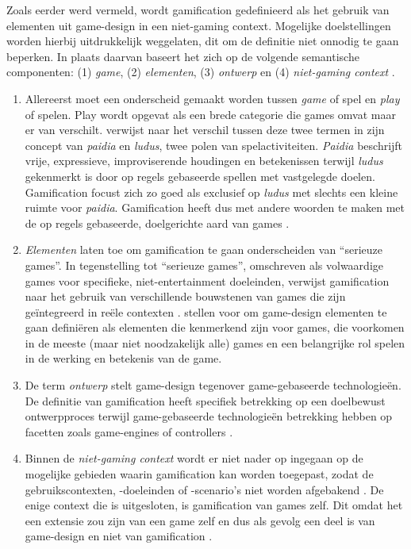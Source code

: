 Zoals eerder werd vermeld, wordt gamification gedefinieerd als het gebruik van elementen uit game-design in een niet-gaming context. Mogelijke doelstellingen worden hierbij uitdrukkelijk weggelaten, dit om de definitie niet onnodig te gaan beperken. In plaats daarvan baseert het zich op de volgende semantische componenten: (1) \textit{game}, (2) \textit{elementen}, (3) \textit{ontwerp} en (4) \textit{niet-gaming context} \autocite{Sailer2016}.

\begin{enumerate}[label=(\arabic*)]
    \item Allereerst moet een onderscheid gemaakt worden tussen \textit{game} of spel en \textit{play} of spelen. Play wordt opgevat als een brede categorie die games omvat maar er van verschilt. \textcite{Caillois2001} verwijst naar het verschil tussen deze twee termen in zijn concept van \textit{paidia} en \textit{ludus}, twee polen van spelactiviteiten. \textit{Paidia} beschrijft vrije, expressieve, improviserende houdingen en betekenissen terwijl \textit{ludus} gekenmerkt is door op regels gebaseerde spellen met vastgelegde doelen. Gamification focust zich zo goed als exclusief op \textit{ludus} met slechts een kleine ruimte voor \textit{paidia}. Gamification heeft dus met andere woorden te maken met de op regels gebaseerde, doelgerichte aard van games \autocite{Sailer2016}.
    \item \textit{Elementen} laten toe om gamification te gaan onderscheiden van ``serieuze games''. In tegenstelling tot ``serieuze games'', omschreven als volwaardige games voor specifieke, niet-entertainment doeleinden, verwijst gamification naar het gebruik van verschillende bouwstenen van games die zijn geïntegreerd in reële contexten \autocite{Groh2012}. \textcite{Deterding20112} stellen voor om game-design elementen te gaan definiëren als elementen die kenmerkend zijn voor games, die voorkomen in de meeste (maar niet noodzakelijk alle) games en een belangrijke rol spelen in de werking en betekenis van de game.
    \item De term \textit{ontwerp} stelt game-design tegenover game-gebaseerde technologieën. De definitie van gamification heeft specifiek betrekking op een doelbewust ontwerpproces terwijl game-gebaseerde technologieën betrekking hebben op facetten zoals game-engines of controllers \autocite{Sailer2016}.
    \item Binnen de \textit{niet-gaming context} wordt er niet nader op ingegaan op de mogelijke gebieden waarin gamification kan worden toegepast, zodat de gebruikscontexten, -doeleinden of -scenario's niet worden afgebakend \autocite{Sailer2016}. De enige context die is uitgesloten, is gamification van games zelf. Dit omdat het een extensie zou zijn van een game zelf en dus als gevolg een deel is van game-design en niet van gamification \autocite{Groh2012}.
\end{enumerate}

